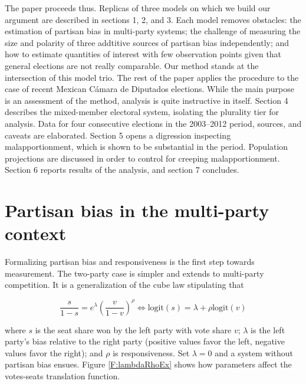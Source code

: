 \documentclass[letter,12pt]{article}
\begin{document}
The paper proceeds thus. Replicas of three models on which we build our argument are described in sections 1, 2, and 3. Each model removes obstacles: \citet{king.1990elRespBiasMultiparty} the estimation of partisan bias in multi-party systems; \citet{grofman.etalBiasMalapp.1997} the challenge of measuring the size and polarity of three addtitive sources of partisan bias independently; and \citet{linzerSeatVoteElasticity2012} how to estimate quantities of interest with few observation points given that general elections are not really comparable. Our method stands at the intersection of this model trio. The rest of the paper applies the procedure to the case of recent Mexican C\'amara de Diputados elections. While the main purpose is an assessment of the method, analysis is quite instructive in itself. Section 4 describes the mixed-member electoral system, isolating the plurality tier for analysis. Data for four consecutive elections in the 2003--2012 period, sources, and caveats are elaborated. Section 5 opens a digression inspecting malapportionment, which is shown to be substantial in the period. Population projections are discussed in order to control for creeping malapportionment. Section 6 reports results of the analysis, and section 7 concludes. 





\section{Partisan bias in the multi-party context}

Formalizing partisan bias and responsiveness is the first step towards measurement. The two-party case is simpler \citep{taagepera.CubeLaw.1973,tufte1973seatsVotes,king.browning1987biasRespUS} and extends to multi-party competition. It is a generalization of the cube law stipulating that 

\begin{equation}\label{E:kingBi}
 \frac{s}{1-s} = e^\lambda  \left(\frac{v}{1-v}\right)^\rho \iff
 \text{logit}(s) = \lambda + \rho  \text{logit}(v)
\end{equation}\label{E:cubeLaw}

\noindent where $s$ is the seat share won by the left party with vote share $v$; $\lambda$ is the left party's bias relative to the right party (positive values favor the left, negative values favor the right); and $\rho$ is responsiveness. Set $\lambda=0$ and a system without partisan bias ensues. Figure \ref{F:lambdaRhoEx} shows how parameters affect the votes-seats translation function. 
\end{document}
